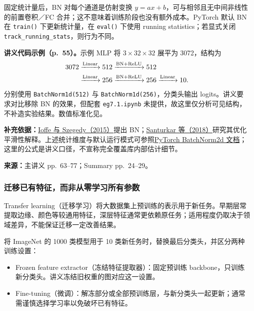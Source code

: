 固定统计量后，BN 对每个通道是仿射变换 $y=ax+b$，可与相邻且无中间非线性的前置卷积／FC 合并；这不意味着训练阶段也没有额外成本。PyTorch 默认 BN 在 \texttt{train()} 下更新统计量，在 \texttt{eval()} 下使用 running statistics；若显式关闭 \texttt{track\_running\_stats}，则行为不同。

\textbf{讲义代码示例（p.~55）。}示例 MLP 将 $3\times32\times32$ 展平为 3072，结构为
\[
 \begin{aligned}
 3072&\xrightarrow{\rm Linear}512\xrightarrow{\rm BN+ReLU}512\\
 &\xrightarrow{\rm Linear}256\xrightarrow{\rm BN+ReLU}256
 \xrightarrow{\rm Linear}10.
 \end{aligned}
\]
分别使用 \texttt{BatchNorm1d(512)} 与 \texttt{BatchNorm1d(256)}，分类头输出 logits。讲义要求对比移除 BN 的效果，但配套 \texttt{eg7.1.ipynb} 未提供，故这里仅分析可见结构，不补造实验结果。数值标准化见。

\textbf{补充依据：}\href{https://arxiv.org/abs/1502.03167}{Ioffe 与 Szegedy（2015）}提出 BN；\href{https://arxiv.org/abs/1805.11604}{Santurkar 等（2018）}研究其优化平滑性解释。上述统计维度与默认运行模式可参照\href{https://docs.pytorch.org/docs/2.14/generated/torch.nn.modules.batchnorm.BatchNorm2d.html}{PyTorch BatchNorm2d 文档}；这里的公式是讲义口径，不宣称完全覆盖库内部估计细节。


\textbf{来源：}主讲义 pp.~63--77；Summary pp.~24--29。

\subsubsection{迁移已有特征，而非从零学习所有参数}

Transfer learning（迁移学习）将大数据集上预训练的表示用于新任务。早期层常提取边缘、颜色等较通用特征，深层特征通常更依赖原任务；适用程度仍取决于领域差异，不能保证迁移一定改善结果。

将 ImageNet 的 1000 类模型用于 10 类新任务时，替换最后分类头，并区分两种训练设置：
\begin{itemize}
 \item Frozen feature extractor（冻结特征提取器）：固定预训练 backbone，只训练新分类头。讲义冻结旧权重的图对应这一设置。
 \item Fine-tuning（微调）：解冻部分或全部预训练层，与新分类头一起更新；通常需谨慎选择学习率以免破坏已有特征。
\end{itemize}

